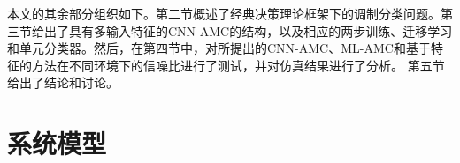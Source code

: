 \documentclass[final]{cvpr}
\newcommand{\IT}{IT\cite{98pami/Itti}}
\newcommand{\MZ}{MZ\cite{03ACMMM/Ma_Contrast-based}}
\newcommand{\GB}{GB\cite{conf/nips/HarelKP06}}
\newcommand{\SR}{SR\cite{07cvpr/hou_SpectralResidual}}
\newcommand{\FT}{FT\cite{09cvpr/Achanta_FTSaliency}}
\newcommand{\CA}{CA\cite{10cvpr/goferman_context}}
\newcommand{\LC}{LC\cite{06acmmm/ZhaiS_spatiotemporal}}
\newcommand{\AC}{AC\cite{08cvs/achanta_salient}}
\begin{document}
本文的其余部分组织如下。第二节概述了经典决策理论框架下的调制分类问题。第三节给出了具有多输入特征的CNN-AMC的结构，以及相应的两步训练、迁移学习和单元分类器。然后，在第四节中，对所提出的CNN-AMC、ML-AMC和基于特征的方法在不同环境下的信噪比进行了测试，并对仿真结果进行了分析。
第五节给出了结论和讨论。








\section{系统模型}
\label{sec:SystemModel}
\end{document}

